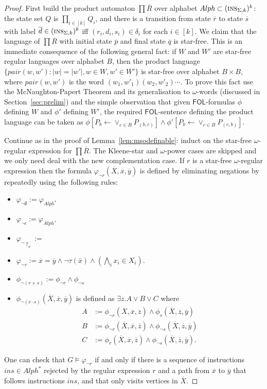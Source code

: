 \documentclass{llncs}
\newcommand{\tup}[1]{\overline{#1}}
\def\ins{\textsc{ins}}
\def\fol{\mathsf{FOL}}
\newcommand{\sr}[1]{\footnote{{\color{red} Note. #1}}}
\renewcommand{\sr}[1]{}
\begin{document}
\begin{proof}

First build the product automaton $\prod \tup{R}$ over alphabet $Alph \subset (\ins_{\Sigma,k})^k$: the state set $Q$ is $\prod_{i \in [k]} Q_i$,  and there is a transition from state $\tup{r}$ to state $\tup{s}$ with label $\tup{d} \in (\ins_{\Sigma,k})^k$ iff $(r_i,d_i,s_i) \in \delta_i$ for each $i \in [k]$. We claim that the language of $\prod \tup{R}$ with initial state $\tup{p}$ and final state $\tup{q}$ is star-free. This is an immediate consequence of the following general fact: if $W$ and $W'$ are star-free regular languages over alphabet $B$, then the product language $\{pair(w,w') : |w| = |w'|, w \in W, w' \in W'\}$ is star-free over alphabet $B\times B$, where $pair(w,w')$ is the word $(w_1, w'_1) (w_2,w'_2) \cdots$. To prove this fact use the McNaughton-Papert Theorem and its generalisation to $\omega$-words (discussed in Section~\ref{sec:prelim})  and the simple observation that given $\fol$-formulas $\phi$ defining $W$ and $\phi'$ defining $W'$,  the required $\fol$-sentence defining the product language can be taken as $\phi[P_b \gets \vee_{c\in B} P_{(b,c)}] \wedge \phi'[P_b \gets \vee_{c\in B} P_{(c,b)}]$.

Continue as in the proof of Lemma~\ref{lem:msodefinable}: induct on the star-free $\omega$-regular expression for $\prod \tup{R}$. The Kleene-star and $\omega$-power cases are skipped and we only need deal with the new complementation case. If $r$ is a star-free $\omega$-regular expression then the formula $\varphi_{\neg r}(\tup{X},\tup{x},\tup{y})$ is defined by eliminating negations by repeatedly using the following rules:
\begin{itemize}
\item $\varphi_{\neg \emptyset} := \varphi_{Alph^*}$
\item $\varphi_{\neg \epsilon} := \varphi_{Alph^+}$
\item $\varphi_{\neg \uparrow_\sigma} := $ \sr{FNISH!}
\item $\varphi_{\neg \tau} := \tup{x} = \tup{y} \wedge \neg \tau(\bar{x}) \wedge (\bigwedge_i x_i \in X_i)$.
\item $\phi_{\neg (r + s)} := \phi_{\neg r} \wedge \phi_{\neg s}$
\item $\phi_{\neg (r \cdot s)}(\tup{X},\tup{x},\tup{y})$ is defined as $\exists z. A \vee B \vee C$ where
\begin{align*}
A &:= \phi_{\neg r}(\tup{X},\tup{x},\tup{z}) \wedge \phi_{s}(\tup{X},\tup{z},\tup{y})\\
B &:= \phi_{\neg r}(\tup{X},\tup{x},\tup{z}) \wedge \phi_{\neg s}(\tup{X},\tup{z},\tup{y})\\
C &:= \phi_{r}(\tup{X},\tup{x},\tup{z}) \wedge \phi_{\neg s}(\tup{X},\tup{z},\tup{y}).
\end{align*}
\end{itemize}
One can check that $G \models \varphi_{\neg r}$ if and only if there is a sequence of instructions $ins \in Alph^*$ rejected  by the regular expression $r$ and a path from $\tup{x}$ to $\tup{y}$ that follows instructions $ins$, and that only visits vertices in $\tup{X}$.
\end{proof}
\fi
\end{document}
